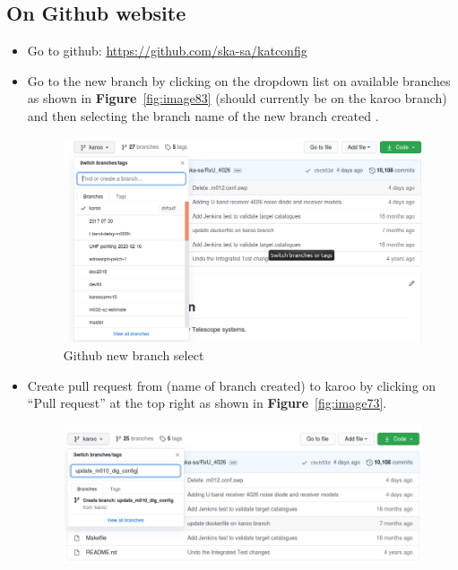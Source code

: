 \subsection{ On Github website}
\begin{itemize}


\item  Go to github:  \url{https://github.com/ska-sa/katconfig}
\item  Go to the new branch by clicking  on the dropdown list on available branches as shown in \textbf{Figure}~\ref{fig:image83} 
(should currently be on the karoo branch) and then selecting the branch name
of the new branch created .
\begin{figure}[H]
	\centering
	\includegraphics[scale=0.43]{Chapters/images/image108.png}
	
	\caption{Github new branch select}
	\label{fig:image108}
\end{figure}

\item Create pull request from  (name of branch created)
to karoo by clicking on “Pull request” at the top right as shown in \textbf{Figure}~\ref{fig:image73}.
\begin{figure}[H]
	\centering
	\includegraphics[scale=0.43]{Chapters/images/image73.png}
	

\end{figure}
\end{itemize}
